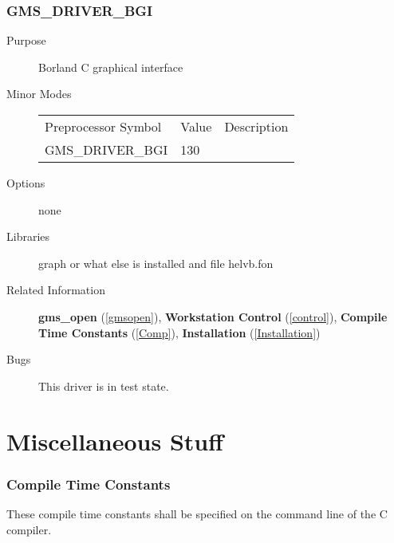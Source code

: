 \newpage



\subsubsection{GMS\_DRIVER\_BGI\label{bgi}}
\begin{description}
\item[Purpose]\mbox{}


Borland C graphical interface
\item[Minor Modes]\mbox{}


\begin{center}
\begin{tabular}{lll}\hline
Preprocessor Symbol & Value& Description\\ 
GMS\_DRIVER\_BGI &  130& \\ 
\hline\end{tabular}
\end{center}

\item[Options]\mbox{}


none
\item[Libraries]\mbox{}


graph or what else is installed  and
file helvb.fon
\item[Related Information]\mbox{}


{\bf gms\_open} (\ref{gmsopen}), 
{\bf Workstation Control} (\ref{control}), 
{\bf Compile Time Constants} (\ref{Comp}), 
{\bf Installation} (\ref{Installation}) 
\item[Bugs]\mbox{}


This driver is in test state.   

\end{description}



\newpage



\section{Miscellaneous Stuff\label{Xrefpages}}

\subsubsection{Compile Time Constants\label{Comp}}These compile time constants shall be specified on 
the command line of the C compiler.

